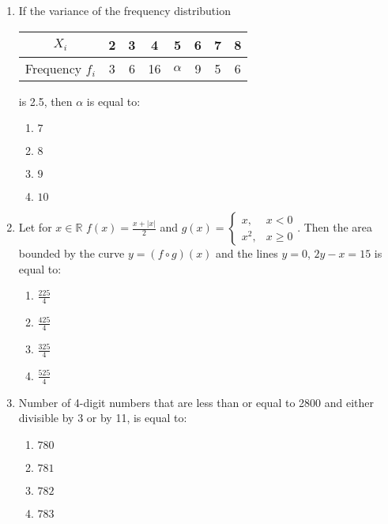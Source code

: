 \documentclass[journal]{IEEEtran}
\newcommand{\brak}[1]{\left( #1 \right)}
\newcommand{\abs}[1]{\left| #1 \right|}
\newcommand{\lt}{<}
\begin{document}
\begin{enumerate}
    \item If the variance of the frequency distribution
    \begin{tabular}{|c|c|c|c|c|c|c|c|}
    \hline
    $X_{i}$ & 2 & 3 & 4 & 5 & 6 & 7 & 8 \\ \hline
    Frequency $f_{i}$ & 3 & 6 & 16 & $\alpha$ & 9 & 5 & 6 \\ \hline
    \end{tabular}
    is 2.5, then $\alpha$ is equal to:
    
        \begin{multicols}{4}
        \begin{enumerate}
        \item $7$
        \item $8$
        \item $9$
        \item $10$
        \end{enumerate}
        \end{multicols}

    \item Let for $x\in\mathbb{R}$
     $f\brak{x}=\frac{x+\abs{x}}{2}$
     and $g\brak{x}=
     \begin{cases}
     x, & x\lt0 \\
     x^{2}, & x\geq0
     \end{cases}$.
     Then the area bounded by the curve $y=\brak{f\circ g}\brak{x}$ and the lines $y=0$, $2y-x=15$ is equal to:
    
        \begin{multicols}{4}
        \begin{enumerate}
        \item $\frac{225}{4}$
        \item $\frac{425}{4}$
        \item $\frac{325}{4}$
        \item $\frac{525}{4}$
        \end{enumerate}
        \end{multicols}

    \item Number of 4-digit numbers that are less than or equal to 2800 and either divisible by 3 or by 11, is equal to:

        \begin{multicols}{4}
        \begin{enumerate}
        \item $780$
        \item $781$
        \item $782$
        \item $783$
        \end{enumerate}
        \end{multicols}
    
\end{enumerate}
        
\end{document}
